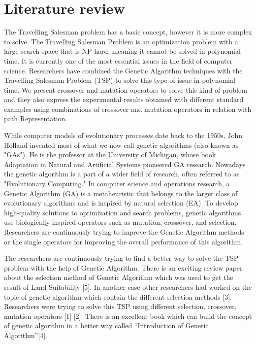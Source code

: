\documentclass{article}
\begin{document}
\section{Literature review}
\quad \quad The Travelling Salesman problem has a basic concept, however it is more complex to solve. The Travelling Salesman Problem is an optimization problem with a large search space that is NP-hard, meaning it cannot be solved in polynomial time. It is currently one of the most essential issues in the field of computer science. Researchers have combined the Genetic Algorithm techniques with the Travelling Salesman Problem (TSP) to solve this type of issue in polynomial time. We present crossover and mutation operators to solve this kind of problem and they also express the experimental results obtained with different standard examples using combinations of crossover and mutation operators in relation with path Representation. \\
\par
While computer models of evolutionary processes date back to the 1950s, John Holland invented most of what we now call genetic algorithms (also known as "GAs"). He is the professor at the University of Michigan, whose book Adaptation in Natural and Artificial Systems pioneered GA research. Nowadays the genetic algorithm is a part of a wider field of research, often referred to as "Evolutionary Computing." In computer science and operations research, a Genetic Algorithm (GA) is a metaheuristic that belongs to the larger class of evolutionary algorithms and is inspired by natural selection (EA). To develop high-quality solutions to optimization and search problems, genetic algorithms use biologically inspired operators such as mutation, crossover, and selection. Researchers are continuously trying to improve the Genetic Algorithm methods or the single operators for improving the overall performance of this algorithm. \\
\par
The researchers are continuously trying to find a better way to solve the TSP problem with the help of Genetic Algorithm. There is an exciting review paper about the selection method of Genetic Algorithm which was used to get the result of Land Suitability [5]. In another case other researchers had worked on the topic of genetic algorithm which contain the different selection methods [3]. Researchers were trying to solve this TSP using different selection, crossover, mutation operators [1] [2]. There is an excellent book which can build the concept of genetic algorithm in a better way called “Introduction of Genetic Algorithm”[4].
\end{document}
